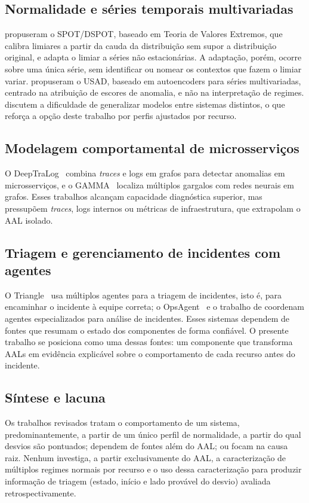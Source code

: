 \documentclass[sigconf,nonacm]{acmart}
\begin{document}
\subsection{Normalidade e séries temporais multivariadas}
\citet{siffer2017dspot} propuseram o SPOT/DSPOT, baseado em Teoria de Valores Extremos, que calibra limiares a partir da cauda da distribuição sem supor a distribuição original, e adapta o limiar a séries não estacionárias. A adaptação, porém, ocorre sobre uma única série, sem identificar ou nomear os contextos que fazem o limiar variar. \citet{audibert2020usad} propuseram o USAD, baseado em autoencoders para séries multivariadas, centrado na atribuição de escores de anomalia, e não na interpretação de regimes. \citet{wang2025crosssystem} discutem a dificuldade de generalizar modelos entre sistemas distintos, o que reforça a opção deste trabalho por perfis ajustados por recurso.

\subsection{Modelagem comportamental de microsserviços}
O DeepTraLog~\citep{zhang2022deeptralog} combina \emph{traces} e logs em grafos para detectar anomalias em microsserviços, e o GAMMA~\citep{somashekar2024gamma} localiza múltiplos gargalos com redes neurais em grafos. Esses trabalhos alcançam capacidade diagnóstica superior, mas pressupõem \emph{traces}, logs internos ou métricas de infraestrutura, que extrapolam o AAL isolado.

\subsection{Triagem e gerenciamento de incidentes com agentes}
O Triangle~\citep{yu2025triangle} usa múltiplos agentes para a triagem de incidentes, isto é, para encaminhar o incidente à equipe correta; o OpsAgent~\citep{luo2025opsagent} e o trabalho de \citet{zhang2025isre} coordenam agentes especializados para análise de incidentes. Esses sistemas dependem de fontes que resumam o estado dos componentes de forma confiável. O presente trabalho se posiciona como uma dessas fontes: um componente que transforma AALs em evidência explicável sobre o comportamento de cada recurso antes do incidente.

\subsection{Síntese e lacuna}
Os trabalhos revisados tratam o comportamento de um sistema, predominantemente, a partir de um único perfil de normalidade, a partir do qual desvios são pontuados; dependem de fontes além do AAL; ou focam na causa raiz. Nenhum investiga, a partir exclusivamente do AAL, a caracterização de múltiplos regimes normais por recurso e o uso dessa caracterização para produzir informação de triagem (estado, início e lado provável do desvio) avaliada retrospectivamente.
\end{document}
